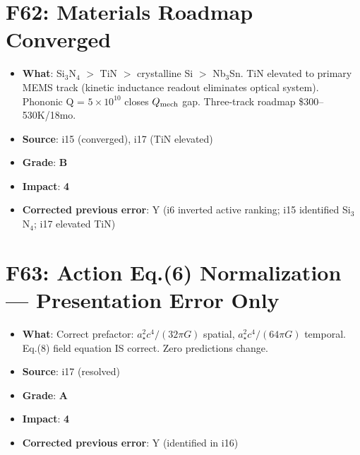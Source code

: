 \documentclass[11pt,a4paper]{article}
\newcommand{\grade}[1]{\textbf{#1}}
\newcommand{\impact}[1]{\textbf{#1}}
\begin{document}
\section{F62: Materials Roadmap Converged}
\begin{itemize}[nosep]
\item \textbf{What}: Si$_3$N$_4$ $>$ TiN $>$ crystalline Si $>$ Nb$_3$Sn. TiN elevated to primary MEMS track (kinetic inductance readout eliminates optical system). Phononic Q = $5 \times 10^{10}$ closes $Q_{\rm mech}$ gap. Three-track roadmap \$300--530K/18mo.
\item \textbf{Source}: i15 (converged), i17 (TiN elevated)
\item \textbf{Grade}: \grade{B}
\item \textbf{Impact}: \impact{4}
\item \textbf{Corrected previous error}: Y (i6 inverted active ranking; i15 identified Si$_3$N$_4$; i17 elevated TiN)
\end{itemize}

\section{F63: Action Eq.(6) Normalization --- Presentation Error Only}
\begin{itemize}[nosep]
\item \textbf{What}: Correct prefactor: $a_\star^2 c^4/(32\pi G)$ spatial, $a_\star^2 c^4/(64\pi G)$ temporal. Eq.(8) field equation IS correct. Zero predictions change.
\item \textbf{Source}: i17 (resolved)
\item \textbf{Grade}: \grade{A}
\item \textbf{Impact}: \impact{4}
\item \textbf{Corrected previous error}: Y (identified in i16)
\end{itemize}

\end{document}
